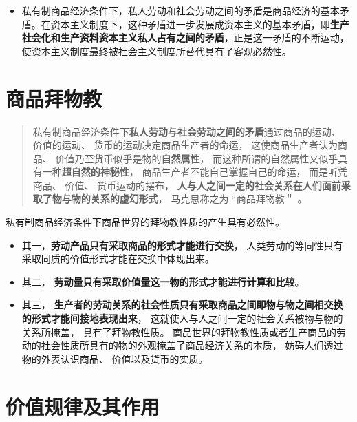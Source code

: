 \documentclass[
]{article}
\begin{document}
\begin{itemize}
\begin{itemize}
    \begin{itemize}
    \item
      商品的售卖过程是私人劳动转化为社会劳动的过程。
    \end{itemize}
  \end{itemize}
\item
  私有制商品经济条件下，私人劳动和社会劳动之间的矛盾是商品经济的基本矛盾。在资本主义制度下，这种矛盾进一步发展成资本主义的基本矛盾，即\textbf{生产社会化和生产资料资本主义私人占有之间的矛盾}，正是这一矛盾的不断运动，使资本主义制度最终被社会主义制度所替代具有了客观必然性。
\end{itemize}

\hypertarget{ux5546ux54c1ux62dcux7269ux6559}{%
\section{商品拜物教}\label{ux5546ux54c1ux62dcux7269ux6559}}

\begin{quote}
私有制商品经济条件下\textbf{私人劳动与社会劳动之间的矛盾}通过商品的运动、
价值的运动、 货币的运动决定商品生产者的命运， 这使商品生产者认为商品、
价值乃至货币似乎是物的\textbf{自然属性}，
而这种所谓的自然属性又似乎具有一种\textbf{超自然的神秘性}，
商品生产者不能自己掌握自己的命运， 而是听凭商品、 价值、
货币运动的摆布，
\textbf{人与人之间一定的社会关系在人们面前采取了物与物的关系的虚幻形式}，
马克思称之为 ``商品拜物教＂ 。
\end{quote}

私有制商品经济条件下商品世界的拜物教性质的产生具有必然性。

\begin{itemize}
\item
  其一，\textbf{劳动产品只有采取商品的形式才能进行交换}，
  人类劳动的等同性只有采取同质的价值形式才能在交换中体现出来。
\item
  其二， \textbf{劳动量只有采取价值量这一物的形式才能进行计算和比较}。
\item
  其三，
  \textbf{生产者的劳动关系的社会性质只有采取商品之间即物与物之间相交换的形式才能间接地表现出来}，
  这就使人与人之间一定的社会关系被物与物的关系所掩盖，
  具有了拜物教性质。
  商品世界的拜物教性质或者生产商品的劳动的社会性质所具有的物的外观掩盖了商品经济关系的本质，
  妨碍人们透过物的外表认识商品、 价值以及货币的实质。
\end{itemize}

\hypertarget{ux4ef7ux503cux89c4ux5f8bux53caux5176ux4f5cux7528}{%
\section{价值规律及其作用}\label{ux4ef7ux503cux89c4ux5f8bux53caux5176ux4f5cux7528}}
\end{document}
